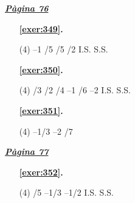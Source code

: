 \hyperlink{page.76}{\textbf{\em Pàgina 76}}
\begin{enumerate}



 \item[\fontfamily{phv}\selectfont\color{blue}\textbf{\ref{exer:349}. }] \label{ans:349}
 \begin{tasks}[column-sep=1em, item-indent=1.3333em](4)
	 \task --1
	 /5
	 /5
	 /2
	 \task I.S.
	 \task S.S.
\end{tasks}
 \end{enumerate}
\begin{enumerate}



 \item[\fontfamily{phv}\selectfont\color{blue}\textbf{\ref{exer:350}. }] \label{ans:350}
 \begin{tasks}[column-sep=1em, item-indent=1.3333em](4)
	 /3
	 /2
	 /4
	 \task --1
	 /6
	 \task --2
	 \task I.S.
	 \task S.S.
\end{tasks}



 \item[\fontfamily{phv}\selectfont\color{blue}\textbf{\ref{exer:351}. }] \label{ans:351}
 \begin{tasks}[column-sep=1em, item-indent=1.3333em](4)
	 \task --1/3
	 \task --2
	 /7
\end{tasks}
 \end{enumerate}
\vspace{0.3cm}


\hyperlink{page.77}{\textbf{\em Pàgina 77}}
\begin{enumerate}



 \item[\fontfamily{phv}\selectfont\color{blue}\textbf{\ref{exer:352}. }] \label{ans:352}
 \begin{tasks}[column-sep=1em, item-indent=1.3333em](4)
	 /5
	 \task --1/3
	 \task --1/2
	 \task I.S.
	 \task S.S.
\end{tasks}
 \end{enumerate}
\vspace{0.3cm}

